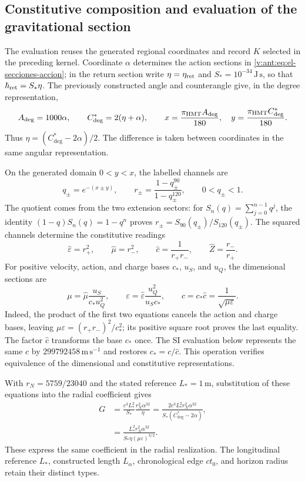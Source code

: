 \subsection{Constitutive composition and evaluation of the gravitational section}
\label{g26:subsec:evaluacion-viii-en}

The evaluation reuses the generated regional coordinates and record
\(K\) selected in the preceding kernel. Coordinate \(\alpha\)
determines the action sections in
\eqref{v:ant:eq:el-secciones-accion}; in the return section write
\(\eta=\eta_{\rm ret}\) and \(S_*=10^{-34}\,\mathrm{J\,s}\), so
that \(\hbar_{\rm ret}=S_*\eta\). The previously constructed angle
and counterangle give, in the degree representation,
\[
 A_{\deg}=1000\alpha,\qquad C^*_{\deg}=2(\eta+\alpha),\qquad
 x=\frac{\pi_{\rm HMT}A_{\deg}}{180},\quad
 y=\frac{\pi_{\rm HMT}C^*_{\deg}}{180}.
\]
Thus \(\eta=(C^*_{\deg}-2\alpha)/2\). The difference is taken
between coordinates in the same angular representation.

On the generated domain \(0<y<x\), the labelled channels are
\[
 q_\pm=e^{-(x\pm y)},\qquad
 r_\pm=\frac{1-q_\pm^{90}}{1-q_\pm^{120}},\qquad
 0<q_\pm<1.
\]
The quotient comes from the two extension sectors: for
\(S_n(q)=\sum_{j=0}^{n-1}q^j\), the identity
\((1-q)S_n(q)=1-q^n\) proves
\(r_\pm=S_{90}(q_\pm)/S_{120}(q_\pm)\).
The squared channels determine the constitutive readings
\[
 \widehat\varepsilon=r_+^2,\qquad
 \widehat\mu=r_-^2,\qquad
 \widehat c=\frac1{r_+r_-},\qquad
 \widehat Z=\frac{r_-}{r_+}.
\]
For positive velocity, action, and charge bases \(c_*\), \(u_S\),
and \(u_Q\), the dimensional sections are
\[
 \mu=\widehat\mu\frac{u_S}{c_*u_Q^2},\qquad
 \varepsilon=\widehat\varepsilon\frac{u_Q^2}{u_Sc_*},\qquad
 c=c_*\widehat c=\frac1{\sqrt{\mu\varepsilon}}.
\]
Indeed, the product of the first two equations cancels the action and
charge bases, leaving \(\mu\varepsilon=(r_+r_-)^2/c_*^2\); its
positive square root proves the last equality. The factor \(\widehat c\)
transforms the base \(c_*\) once. The SI evaluation below represents
the same \(c\) by \(299792458\,\mathrm{m\,s^{-1}}\) and restores
\(c_*=c/\widehat c\). This operation verifies equivalence of the
dimensional and constitutive representations.

With \(r_N=5759/23040\) and the stated reference \(L_*=1\,\mathrm m\),
substitution of these equations into the radial coefficient gives
\begin{align}
 G&=\frac{c^3L_*^2}{S_*}\frac{r_N^2\alpha^{32}}{\eta}
   =\frac{2c^3L_*^2r_N^2\alpha^{32}}
           {S_*(C^*_{\deg}-2\alpha)},\label{g26:eq:g-angular-viii-en}\\
  &=\frac{L_*^2r_N^2\alpha^{32}}
           {S_*\eta(\mu\varepsilon)^{3/2}}.
 \label{g26:eq:g-constitutivo-viii-en}
\end{align}
These express the same coefficient in the radial realization. The
longitudinal reference \(L_*\), constructed length \(L_\alpha\),
chronological edge \(ct_0\), and horizon radius retain their distinct
types.

